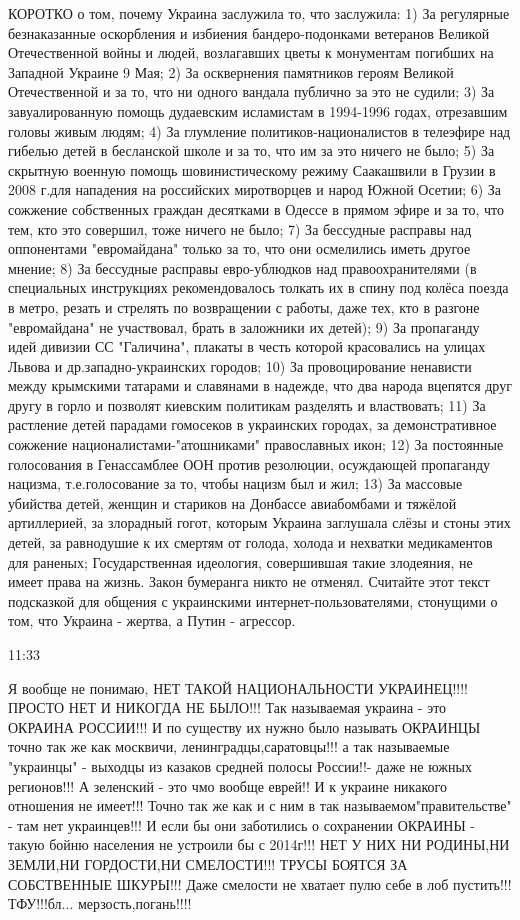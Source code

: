 КОРОТКО о том, почему Украина заслужила то, что заслужила:
1) За регулярные безнаказанные оскорбления и избиения бандеро-подонками ветеранов Великой Отечественной войны и людей, возлагавших цветы к монументам погибших на Западной Украине 9 Мая;
2) За осквернения памятников героям Великой Отечественной и за то, что ни одного вандала публично за это не судили;
3) За завуалированную помощь дудаевским исламистам в 1994-1996 годах, отрезавшим головы живым людям;
4) За глумление политиков-националистов в телеэфире над гибелью детей в бесланской школе и за то, что им за это ничего не было;
5) За скрытную военную помощь шовинистическому режиму Саакашвили в Грузии в 2008 г.для нападения на российских миротворцев и народ Южной Осетии;
6) За сожжение собственных граждан десятками в Одессе в прямом эфире и за то, что тем, кто это совершил, тоже ничего не было;
7) За бессудные расправы над оппонентами "евромайдана" только за то, что они осмелились иметь другое мнение;
8) За бессудные расправы евро-ублюдков над правоохранителями (в специальных инструкциях рекомендовалось толкать их в спину под колёса поезда в метро, резать и стрелять по возвращении с работы, даже тех, кто в разгоне "евромайдана" не участвовал, брать в заложники их детей);
9) За пропаганду идей дивизии СС "Галичина", плакаты в честь которой красовались на улицах Львова и др.западно-украинских городов;
10) За провоцирование ненависти между крымскими татарами и славянами в надежде, что два народа вцепятся друг другу в горло и позволят киевским политикам разделять и властвовать;
11) За растление детей парадами гомосеков в украинских городах, за демонстративное сожжение националистами-"атошниками" православных икон;
12) За постоянные голосования в Генассамблее ООН против резолюции, осуждающей пропаганду нацизма, т.е.голосование за то, чтобы нацизм был и жил;
13) За массовые убийства детей, женщин и стариков на Донбассе авиабомбами и тяжёлой артиллерией, за злорадный гогот, которым Украина заглушала слёзы и стоны этих детей, за равнодушие к их смертям от голода, холода и нехватки медикаментов для раненых;
Государственная идеология, совершившая такие злодеяния, не имеет права на жизнь. Закон бумеранга никто не отменял.
Считайте этот текст подсказкой для общения с украинскими интернет-пользователями, стонущими о том, что Украина - жертва, а Путин - агрессор.

11:33

Я вообще не понимаю, НЕТ ТАКОЙ НАЦИОНАЛЬНОСТИ УКРАИНЕЦ!!!! ПРОСТО НЕТ И НИКОГДА
НЕ БЫЛО!!! Так называемая украина - это ОКРАИНА РОССИИ!!! И по существу их
нужно было называть ОКРАИНЦЫ точно так же как москвичи,
ленинградцы,саратовцы!!! а так называемые "украинцы" - выходцы из казаков
средней полосы России!!- даже не южных регионов!!! А зеленский - это чмо вообще
еврей!! И к украине никакого отношения не имеет!!! Точно так же как и с ним в
так называемом"правительстве" - там нет украинцев!!! И если бы они заботились о
сохранении ОКРАИНЫ - такую бойню населения не устроили бы с 2014г!!! НЕТ У НИХ
НИ РОДИНЫ,НИ ЗЕМЛИ,НИ ГОРДОСТИ,НИ СМЕЛОСТИ!!! ТРУСЫ БОЯТСЯ ЗА СОБСТВЕННЫЕ
ШКУРЫ!!! Даже смелости не хватает пулю себе в лоб пустить!!! ТФУ!!!бл...
мерзость,погань!!!!

